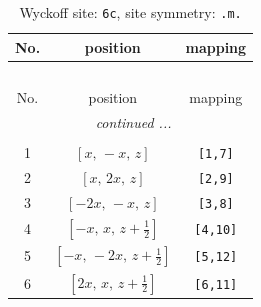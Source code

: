 \documentclass[fleqn,8pt]{jsarticle}
\begin{document}
\renewcommand{\arraystretch}{1.2}
\begin{longtable}{ccc}
\caption{Wyckoff site: {\tt 6c}, site symmetry: {\tt .m.}}
 \\
 \hline \hline
No. & position & mapping \\ \hline \endfirsthead

\multicolumn{2}{l}{\tablename\ \thetable{}} \\
 \hline \hline
No. & position & mapping \\ \hline \endhead

 \hline \hline
\multicolumn{2}{r}{\footnotesize\it continued ...} \\ \endfoot

 \hline \hline
\multicolumn{2}{r}{} \\ \endlastfoot

1 & $\left[ x,\, - x,\, z \right]$ & {\tt [1,7]} \\ \hline
2 & $\left[ x,\, 2 x,\, z \right]$ & {\tt [2,9]} \\ \hline
3 & $\left[ - 2 x,\, - x,\, z \right]$ & {\tt [3,8]} \\ \hline
4 & $\left[ - x,\, x,\, z + \frac{1}{2} \right]$ & {\tt [4,10]} \\ \hline
5 & $\left[ - x,\, - 2 x,\, z + \frac{1}{2} \right]$ & {\tt [5,12]} \\ \hline
6 & $\left[ 2 x,\, x,\, z + \frac{1}{2} \right]$ & {\tt [6,11]} \\
\end{longtable}
\renewcommand{\arraystretch}{1.2}
\end{document}
